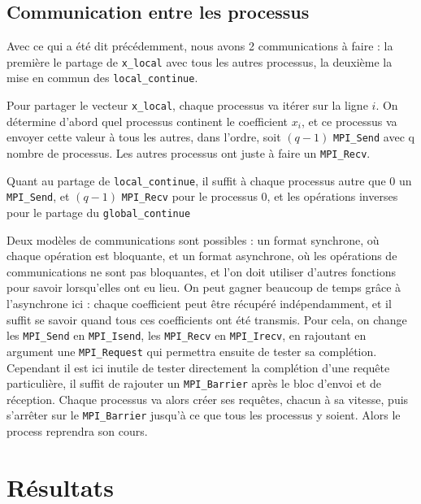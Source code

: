 \documentclass[11pt, a4paper]{article}
\begin{document}
\newpage
\subsection{Communication entre les processus}

Avec ce qui a été dit précédemment, nous avons 2 communications à faire :
la première le partage de \lstinline{x_local} avec tous les autres processus,
la deuxième la mise en commun des \lstinline{local_continue}.

\bigskip

Pour partager le vecteur \lstinline{x_local}, chaque processus va itérer sur la ligne \(i\).
On détermine d'abord quel processus continent le coefficient \(x_i\),
et ce processus va envoyer cette valeur à tous les autres, dans l'ordre,
soit \((q-1)\) \lstinline{MPI_Send} avec q nombre de processus.
Les autres processus ont juste à faire un \lstinline{MPI_Recv}.

Quant au partage de \lstinline{local_continue},
il suffit à chaque processus autre que 0 un \lstinline{MPI_Send}, et
\((q-1)\) \lstinline{MPI_Recv} pour le processus 0, et les opérations inverses
pour le partage du \lstinline{global_continue}

\bigskip

Deux modèles de communications sont possibles : un format synchrone,
où chaque opération est bloquante, et un format asynchrone, où les opérations
de communications ne sont pas bloquantes, et l'on doit utiliser d'autres fonctions
pour savoir lorsqu'elles ont eu lieu.
On peut gagner beaucoup de temps grâce à l'asynchrone ici :
chaque coefficient peut être récupéré indépendamment, et il suffit se savoir
quand tous ces coefficients ont été transmis.
Pour cela, on change les \lstinline{MPI_Send} en \lstinline{MPI_Isend},
les \lstinline{MPI_Recv} en \lstinline{MPI_Irecv}, en rajoutant en argument
une \lstinline{MPI_Request} qui permettra ensuite de tester sa complétion.
Cependant il est ici inutile de tester directement la complétion d'une requête particulière,
il suffit de rajouter un \lstinline{MPI_Barrier} après le bloc d'envoi et de réception.
Chaque processus va alors créer ses requêtes, chacun à sa vitesse, puis s'arrêter sur le \lstinline{MPI_Barrier} jusqu'à ce que tous les processus y soient.
Alors le process reprendra son cours.


\newpage

\section{Résultats}
\end{document}
